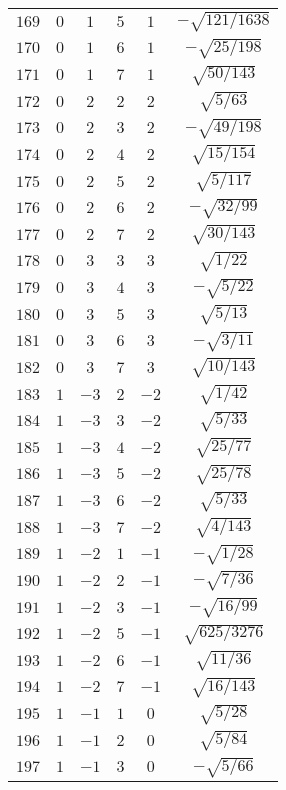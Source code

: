 \begin{table}
\begin{center}
\begin{tabular}{|c|c|c|c|c|c|}
$169$ & $0$ & $1$ & $5$ & $1$ & $-\sqrt{121/1638}$ \\ 
$170$ & $0$ & $1$ & $6$ & $1$ & $-\sqrt{25/198}$ \\ 
$171$ & $0$ & $1$ & $7$ & $1$ & $\sqrt{50/143}$ \\ 
$172$ & $0$ & $2$ & $2$ & $2$ & $\sqrt{5/63}$ \\ 
$173$ & $0$ & $2$ & $3$ & $2$ & $-\sqrt{49/198}$ \\ 
$174$ & $0$ & $2$ & $4$ & $2$ & $\sqrt{15/154}$ \\ 
$175$ & $0$ & $2$ & $5$ & $2$ & $\sqrt{5/117}$ \\ 
$176$ & $0$ & $2$ & $6$ & $2$ & $-\sqrt{32/99}$ \\ 
$177$ & $0$ & $2$ & $7$ & $2$ & $\sqrt{30/143}$ \\ 
$178$ & $0$ & $3$ & $3$ & $3$ & $\sqrt{1/22}$ \\ 
$179$ & $0$ & $3$ & $4$ & $3$ & $-\sqrt{5/22}$ \\ 
$180$ & $0$ & $3$ & $5$ & $3$ & $\sqrt{5/13}$ \\ 
$181$ & $0$ & $3$ & $6$ & $3$ & $-\sqrt{3/11}$ \\ 
$182$ & $0$ & $3$ & $7$ & $3$ & $\sqrt{10/143}$ \\ 
$183$ & $1$ & $-3$ & $2$ & $-2$ & $\sqrt{1/42}$ \\ 
$184$ & $1$ & $-3$ & $3$ & $-2$ & $\sqrt{5/33}$ \\ 
$185$ & $1$ & $-3$ & $4$ & $-2$ & $\sqrt{25/77}$ \\ 
$186$ & $1$ & $-3$ & $5$ & $-2$ & $\sqrt{25/78}$ \\ 
$187$ & $1$ & $-3$ & $6$ & $-2$ & $\sqrt{5/33}$ \\ 
$188$ & $1$ & $-3$ & $7$ & $-2$ & $\sqrt{4/143}$ \\ 
$189$ & $1$ & $-2$ & $1$ & $-1$ & $-\sqrt{1/28}$ \\ 
$190$ & $1$ & $-2$ & $2$ & $-1$ & $-\sqrt{7/36}$ \\ 
$191$ & $1$ & $-2$ & $3$ & $-1$ & $-\sqrt{16/99}$ \\ 
$192$ & $1$ & $-2$ & $5$ & $-1$ & $\sqrt{625/3276}$ \\ 
$193$ & $1$ & $-2$ & $6$ & $-1$ & $\sqrt{11/36}$ \\ 
$194$ & $1$ & $-2$ & $7$ & $-1$ & $\sqrt{16/143}$ \\ 
$195$ & $1$ & $-1$ & $1$ & $0$ & $\sqrt{5/28}$ \\ 
$196$ & $1$ & $-1$ & $2$ & $0$ & $\sqrt{5/84}$ \\ 
$197$ & $1$ & $-1$ & $3$ & $0$ & $-\sqrt{5/66}$ \\ 

\end{tabular}
\end{center}
\end{table}
